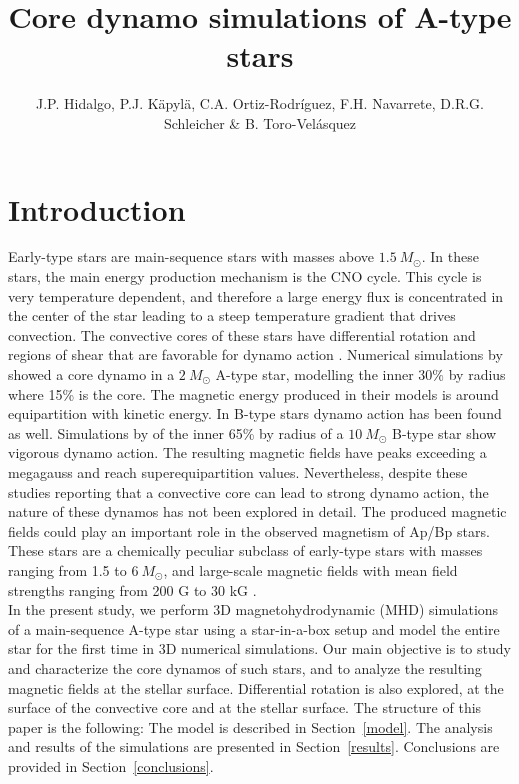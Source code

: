 \documentclass[baaa]{baaa}
\title{Core dynamo simulations of A-type stars}
\author{
J.P. Hidalgo\inst{1}, 
P.J. Käpylä\inst{2}, 
C.A. Ortiz-Rodríguez\inst{3}, 
F.H. Navarrete\inst{4}, 
D.R.G. Schleicher\inst{1}
\& 
B. Toro-Velásquez \inst{1} 
}
\institute{
Departamento de Astronomía, Universidad de Concepción, Chile
\and
Institut für Sonnenphysik, KIS, Alemania  
\and
Hamburger Sternwarte, Universität Hamburg, Alemania
\and
Institute of Space Sciences, ICE--CSIC, España}
\begin{document}
\maketitle
\section{Introduction}\label{S_intro}

Early-type stars are main-sequence stars with masses above $1.5~M_\odot$. In these stars, the main energy production mechanism is the CNO cycle. This cycle is very temperature dependent, and therefore a large energy flux is concentrated in the center of the star leading to a steep
temperature gradient that drives convection. The convective cores of these stars have differential rotation and regions of shear that are favorable for dynamo action \citep{Krause-1976, Browning-2008}. Numerical simulations by \cite{Brun-2005} showed a core dynamo in a $2~M_\odot$ A-type star, modelling the inner $30\%$ by radius where 15\% is the core. The magnetic energy produced in their models is around equipartition with kinetic energy. In B-type stars dynamo action has been found as well. Simulations by \cite{Augustson-2016} of the inner 65\% by radius of a $10~M_\odot$ B-type star show vigorous dynamo action. The resulting magnetic fields have peaks exceeding a megagauss and reach superequipartition values. Nevertheless, despite these studies reporting that a convective core can lead to strong dynamo action, the nature of these dynamos has not been explored in detail. The produced magnetic fields could play an important role in the observed magnetism of Ap/Bp stars. These stars are a chemically peculiar subclass of early-type stars with masses ranging from 1.5 to $6~M_\odot$, and large-scale magnetic fields with mean field strengths ranging from 200 G to 30 kG \cite{Auriere-2007}.\\

In the present study, we perform 3D magnetohydrodynamic (MHD) simulations of a main-sequence A-type star using a star-in-a-box setup and model the entire star for the first time in 3D numerical simulations. Our main objective is to study and characterize the core dynamos of such stars, and to analyze the resulting magnetic fields at the stellar surface. Differential rotation is also explored, at the surface of the convective core and at the stellar surface. The structure of this paper is the following: The model is described in Section~\ref{model}. The analysis and results of the simulations are presented in Section~\ref{results}. Conclusions are provided in Section~\ref{conclusions}.
\end{document}
